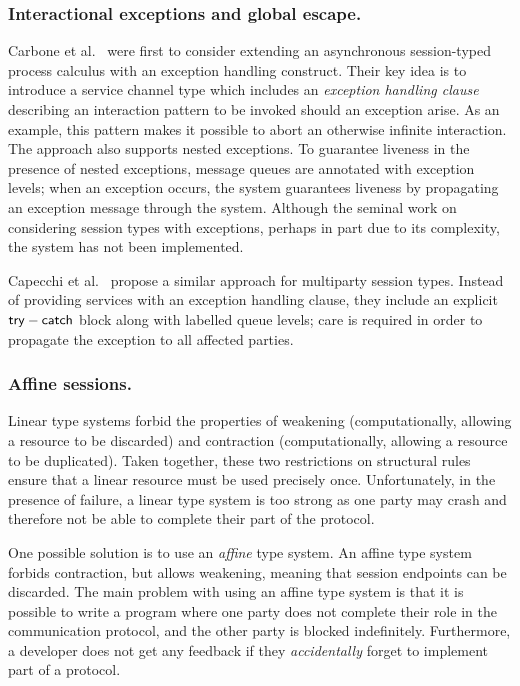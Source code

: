 \documentclass[
graybox,
envcountchap
]{svmult}
\begin{document}
\begin{bibunit}
  \subsubsection{Interactional exceptions and global escape.}
  Carbone et al.~\cite{CarboneHY08:exceptions} were first to consider extending
  an asynchronous session-typed process calculus with an exception handling
  construct. Their key idea is to introduce a service channel type which includes an
  \emph{exception handling clause} describing an interaction pattern to be
  invoked should an exception arise. As an example, this pattern makes it
  possible to abort an otherwise infinite interaction. The approach also
  supports nested exceptions. To guarantee liveness in the presence of nested
  exceptions, message queues are annotated with exception levels; when an
  exception occurs, the system guarantees liveness by propagating an exception
  message through the system. Although the seminal work on considering session
  types with exceptions, perhaps in part due to its complexity, the system has
  not been implemented.

  Capecchi et al.~\cite{CapecchiGY16:global-escape} propose a similar approach
  for multiparty session types. Instead of providing services with an exception
  handling clause, they include an explicit $\mathsf{try}-\mathsf{catch}$ block
  along with labelled queue levels; care is required in order to propagate the
  exception to all affected parties.

  \subsubsection{Affine sessions.}

  Linear type systems forbid the properties of weakening (computationally,
  allowing a resource to be discarded) and contraction (computationally,
  allowing a resource to be duplicated).  Taken together, these two restrictions
  on structural rules ensure that a linear resource must be used precisely once.
  Unfortunately, in the presence of failure, a linear type system is too strong
  as one party may crash and therefore not be able to complete their part of the
  protocol.

  One possible solution is to use an \emph{affine} type system. An affine type
  system forbids contraction, but allows weakening,
  meaning that session endpoints can be discarded.
%
  The main problem with using an affine type system is that it is possible to
  write a program where one party does not complete their role in the
  communication protocol, and the other party is blocked indefinitely.
  Furthermore, a developer does not get any feedback if they \emph{accidentally}
  forget to implement part of a protocol.


\end{bibunit}
\end{document}
